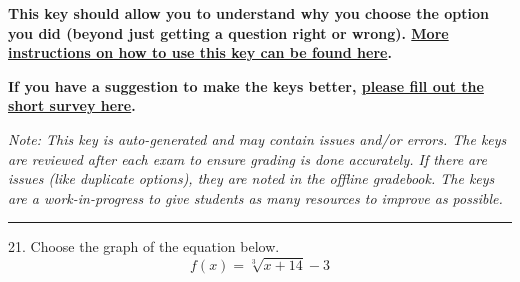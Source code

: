 \documentclass{article}[14pt]
\begin{document}
\textbf{This key should allow you to understand why you choose the option you did (beyond just getting a question right or wrong). \href{https://xronos.clas.ufl.edu/mac1105spring2020/courseDescriptionAndMisc/Exams/LearningFromResults}{More instructions on how to use this key can be found here}.}

\textbf{If you have a suggestion to make the keys better, \href{https://forms.gle/CZkbZmPbC9XALEE88}{please fill out the short survey here}.}

\textit{Note: This key is auto-generated and may contain issues and/or errors. The keys are reviewed after each exam to ensure grading is done accurately. If there are issues (like duplicate options), they are noted in the offline gradebook. The keys are a work-in-progress to give students as many resources to improve as possible.}

\rule{\textwidth}{0.4pt}

21. Choose the graph of the equation below.
$$ f(x) = \sqrt[3]{x + 14} - 3 $$ 
\end{document}
